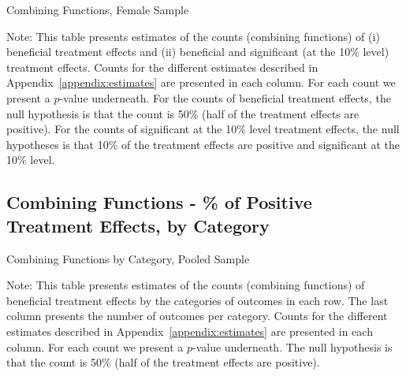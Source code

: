	\begin{table}[H]
     \caption{Combining Functions, Female Sample} 
     \label{table:abccare_rslt_female_counts}
	
	\end{table}  
\begin{spacing}{1}
\begin{footnotesize}
\noindent 	Note: This table presents estimates of the counts (combining functions) of (i) beneficial treatment effects and (ii) beneficial and significant (at the 10\% level) treatment effects. Counts for the different estimates described in Appendix~\ref{appendix:estimates} are presented in each column. For each count we present a $p$-value underneath. For the counts of beneficial treatment effects, the null hypothesis is that the count is 50\% (half of the treatment effects are positive). For the counts of significant at the 10\% level treatment effects, the null hypotheses is that 10\% of the treatment effects are positive and significant at the 10\% level. 
\end{footnotesize}
\end{spacing}
\clearpage

\subsection{{Combining Functions - \% of Positive Treatment Effects, by Category}}


	\begin{table}[H]
     \caption{Combining Functions by Category, Pooled Sample} 
     \label{table:abccare_rslt_pooled_counts_n50a100}
	
	\end{table}
\begin{spacing}{1}
\begin{footnotesize}
\noindent Note: This table presents estimates of the counts (combining functions) of beneficial treatment effects by the categories of outcomes in each row. The last column presents the number of outcomes per category. Counts for the different estimates described in Appendix~\ref{appendix:estimates} are presented in each column. For each count we present a $p$-value underneath. The null hypothesis is that the count is 50\% (half of the treatment effects are positive).
\end{footnotesize}
\end{spacing}   

